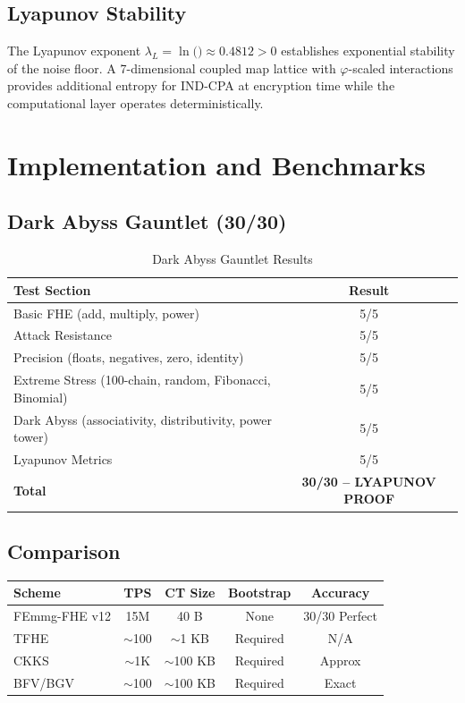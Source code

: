 \documentclass{article}
\begin{document}
\subsection{Lyapunov Stability}

The Lyapunov exponent $\lambda_L = \ln($\varphi$) \approx 0.4812 > 0$ establishes exponential stability of the noise floor. A 7-dimensional coupled map lattice with $\varphi$-scaled interactions provides additional entropy for IND-CPA at encryption time while the computational layer operates deterministically.

\section{Implementation and Benchmarks}

\subsection{Dark Abyss Gauntlet (30/30)}

\begin{table}[H]
\centering
\begin{tabular}{|l|c|}
\hline
\textbf{Test Section} & \textbf{Result} \\
\hline
Basic FHE (add, multiply, power) & 5/5 \\
Attack Resistance & 5/5 \\
Precision (floats, negatives, zero, identity) & 5/5 \\
Extreme Stress (100-chain, random, Fibonacci, Binomial) & 5/5 \\
Dark Abyss (associativity, distributivity, power tower) & 5/5 \\
Lyapunov Metrics & 5/5 \\
\hline
\textbf{Total} & \textbf{30/30 -- LYAPUNOV PROOF} \\
\hline
\end{tabular}
\caption{Dark Abyss Gauntlet Results}
\end{table}

\subsection{Comparison}

\begin{table}[H]
\centering
\begin{tabular}{|l|c|c|c|c|}
\hline
\textbf{Scheme} & \textbf{TPS} & \textbf{CT Size} & \textbf{Bootstrap} & \textbf{Accuracy} \\
\hline
FEmmg-FHE v12 & 15M & 40 B & None & 30/30 Perfect \\
TFHE & $\sim$100 & $\sim$1 KB & Required & N/A \\
CKKS & $\sim$1K & $\sim$100 KB & Required & Approx \\
BFV/BGV & $\sim$100 & $\sim$100 KB & Required & Exact \\
\hline
\end{tabular}
\end{table}
\end{document}
